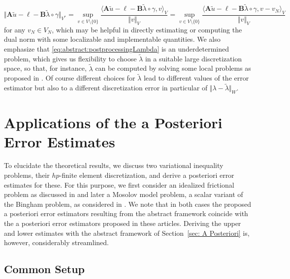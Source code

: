 \documentclass[12pt,twoside,reqno]{amsart}
\theoremstyle{definition}
\numberwithin{equation}{section}
\newcommand{\A} {\bm{A}}
\newcommand{\B} {\bm{B}}
\newcommand{\norm}[1]    {\Vert #1 \Vert}
\begin{document}
$$ \norm{\A \tilde{u}-\bm{\ell} -\B{\tilde{\lambda}}\circ\gamma}_{V^*} = \sup_{v\in V\setminus\{0\}} \frac{\langle \A \tilde{u}-\bm{\ell} -\B{\tilde{\lambda}}\circ\gamma,v\rangle_V}{\norm{v}_V} = \sup_{v\in V\setminus\{0\}} \frac{\langle \A \tilde{u}-\bm{\ell} -\B{\tilde{\lambda}}\circ\gamma,v-v_N\rangle_V}{\norm{v}_V}$$
for any $v_N \in V_N$, which may be helpful in directly estimating or computing the dual norm with some localizable and implementable quantities.
We also emphasize that \eqref{eq:abstract:postprocessingLambda} is an underdetermined problem, which gives us flexibility to choose $\tilde{\lambda}$ in a suitable large discretization space, so that, for instance, $\tilde{\lambda}$ can be computed by solving some local problems as proposed in \cite[Sec.~5]{Burg2015}. Of course different choices for $\tilde{\lambda}$ lead to different values of the error estimator but also to a different discretization error in particular of $\norm{\lambda-\tilde{\lambda}}_W$.




    

\section{Applications of the a Posteriori Error Estimates}\label{sec: application}
    
To elucidate the theoretical results, we discuss two variational inequality problems, their $hp$-finite element discretization, and derive a posteriori error estimates for these. For this purpose, we first consider an idealized frictional problem as discussed in \cite{Schroder2011a} and later a Mosolov model problem, a scalar variant of the Bingham problem, as considered in \cite{Banz2022}. We note that in both cases  the proposed a posteriori error estimators resulting from the abstract framework coincide with the a posteriori error estimators proposed in these articles. Deriving the upper and lower estimates with the abstract framework of Section~\ref{sec: A Posteriori} is, however, considerably streamlined.


    
    \subsection{Common Setup}
    
\end{document}
